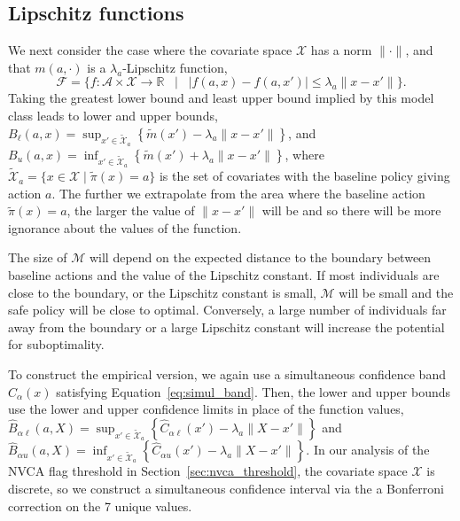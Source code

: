 \documentclass[12pt]{article}
\theoremstyle{definition}
\newcommand{\R}{\ensuremath{\mathbb{R}}}
\newcommand{\<}{\langle}
\renewcommand{\>}{\rangle}
\newcommand\mcal[1]{\ensuremath{\mathcal{#1}}}
\begin{document}
\subsection{Lipschitz functions}
\label{sec:lip}

We next consider the case where the covariate space $\mcal{X}$ has a
norm $\|\cdot\|$, and that $m(a, \cdot)$ is a $\lambda_a$-Lipschitz
function,
\begin{equation*}
  \mcal{F} = \{f:\mcal{A} \times \mcal{X} \to \R \;\; \mid \;\; |f(a, x) - f(a, x')| \leq \lambda_a \|x - x'\|\}.
\end{equation*}
Taking the greatest lower bound and least upper bound implied by this
model class leads to lower and upper bounds,
$B_\ell(a,x) = \sup_{x' \in \tilde{\mcal{X}}_a} \left\{\tilde{m}(x') -
  \lambda_a \|x - x'\|\right\}$, and
$B_u(a,x) = \inf_{x' \in \tilde{\mcal{X}}_a} \left\{\tilde{m}(x') +
  \lambda_a \|x - x'\|\right\}$, where
$\tilde{\mcal{X}}_a = \{x \in \mcal{X} \mid \tilde{\pi}(x) = a\}$ is
the set of covariates with the baseline policy giving action $a$.  The
further we extrapolate from the area where the baseline action
$\tilde{\pi}(x) = a$, the larger the value of $\|x - x'\|$ will be and
so there will be more ignorance about the values of the function.

The size of $\mcal{M}$ will depend on the expected distance to the
boundary between baseline actions and the value of the Lipschitz
constant.  If most individuals are close to the boundary, or the
Lipschitz constant is small, $\mcal{M}$ will be small and the safe
policy will be close to optimal. Conversely, a large number of
individuals far away from the boundary or a large Lipschitz constant
will increase the potential for suboptimality.

To construct the empirical version, we again use a simultaneous
confidence band $\widehat{C}_{\alpha}(x)$ satisfying
Equation~\eqref{eq:simul_band}.  Then, the lower and upper bounds use
the lower and upper confidence limits in place of the function values,
$\widehat{B}_{\alpha \ell}(a,X) = \sup_{x' \in
  \tilde{\mcal{X}}_a}\left\{ \widehat{C}_{\alpha \ell}(x') - \lambda_a
  \|X - x'\| \right\}$ and
$\widehat{B}_{\alpha u}(a,X) = \inf_{x' \in \tilde{\mcal{X}}_a}\left\{
  \widehat{C}_{\alpha u}(x') - \lambda_a \|X - x'\|\right\}$.  In our
analysis of the NVCA flag threshold in
Section~\ref{sec:nvca_threshold}, the covariate space $\mathcal{X}$ is
discrete, so we construct a simultaneous confidence interval via the
a Bonferroni correction on the 7 unique values.
\end{document}
